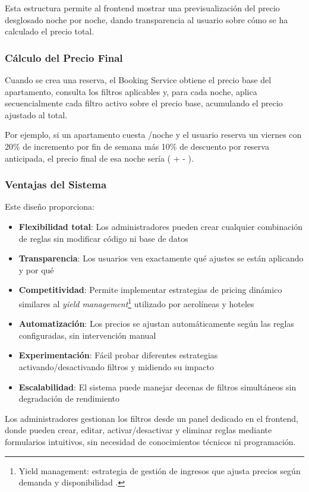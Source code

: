 Esta estructura permite al frontend mostrar una previsualización del precio desglosado noche por noche, dando transparencia al usuario sobre cómo se ha calculado el precio total.


\subsubsection{Cálculo del Precio Final}
Cuando se crea una reserva, el Booking Service obtiene el precio base del apartamento, consulta los filtros aplicables y, para cada noche, aplica secuencialmente cada filtro activo sobre el precio base, acumulando el precio ajustado al total.

Por ejemplo, si un apartamento cuesta /noche y el usuario reserva un viernes con 20\% de incremento por fin de semana más 10\% de descuento por reserva anticipada, el precio final de esa noche sería  ( +  - ).

\subsubsection{Ventajas del Sistema}
Este diseño proporciona:
\begin{itemize}
\item \textbf{Flexibilidad total}: Los administradores pueden crear cualquier combinación de reglas sin modificar código ni base de datos
\item \textbf{Transparencia}: Los usuarios ven exactamente qué ajustes se están aplicando y por qué
\item \textbf{Competitividad}: Permite implementar estrategias de pricing dinámico similares al \textit{yield management}\footnote{Yield management: estrategia de gestión de ingresos que ajusta precios según demanda y disponibilidad \cite{kimes1989}.} utilizado por aerolíneas y hoteles
\item \textbf{Automatización}: Los precios se ajustan automáticamente según las reglas configuradas, sin intervención manual
\item \textbf{Experimentación}: Fácil probar diferentes estrategias activando/desactivando filtros y midiendo su impacto
\item \textbf{Escalabilidad}: El sistema puede manejar decenas de filtros simultáneos sin degradación de rendimiento
\end{itemize}
Los administradores gestionan los filtros desde un panel dedicado en el frontend, donde pueden crear, editar, activar/desactivar y eliminar reglas mediante formularios intuitivos, sin necesidad de conocimientos técnicos ni programación.

